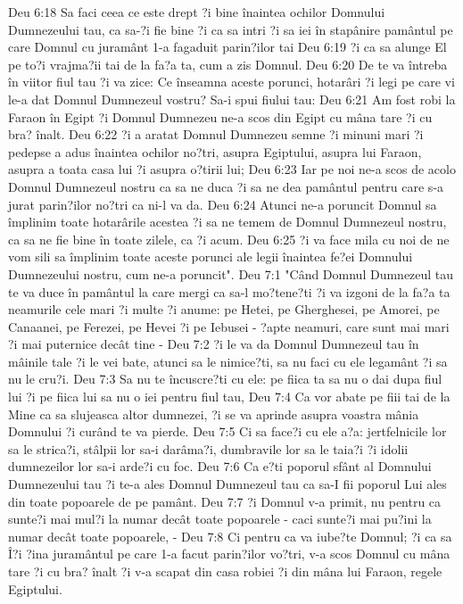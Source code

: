 Deu 6:18  Sa faci ceea ce este drept ?i bine înaintea ochilor Domnului Dumnezeului tau, ca sa-?i fie bine ?i ca sa intri ?i sa iei în stapânire pamântul pe care Domnul cu juramânt 1-a fagaduit parin?ilor tai
Deu 6:19  ?i ca sa alunge El pe to?i vrajma?ii tai de la fa?a ta, cum a zis Domnul.
Deu 6:20  De te va întreba în viitor fiul tau ?i va zice: Ce înseamna aceste porunci, hotarâri ?i legi pe care vi le-a dat Domnul Dumnezeul vostru? Sa-i spui fiului tau:
Deu 6:21  Am fost robi la Faraon în Egipt ?i Domnul Dumnezeu ne-a scos din Egipt cu mâna tare ?i cu bra? înalt.
Deu 6:22  ?i a aratat Domnul Dumnezeu semne ?i minuni mari ?i pedepse a adus înaintea ochilor no?tri, asupra Egiptului, asupra lui Faraon, asupra a toata casa lui ?i asupra o?tirii lui;
Deu 6:23  Iar pe noi ne-a scos de acolo Domnul Dumnezeul nostru ca sa ne duca ?i sa ne dea pamântul pentru care s-a jurat parin?ilor no?tri ca ni-l va da.
Deu 6:24  Atunci ne-a poruncit Domnul sa împlinim toate hotarârile acestea ?i sa ne temem de Domnul Dumnezeul nostru, ca sa ne fie bine în toate zilele, ca ?i acum.
Deu 6:25  ?i va face mila cu noi de ne vom sili sa împlinim toate aceste porunci ale legii înaintea fe?ei Domnului Dumnezeului nostru, cum ne-a poruncit".
Deu 7:1  "Când Domnul Dumnezeul tau te va duce în pamântul la care mergi ca sa-l mo?tene?ti ?i va izgoni de la fa?a ta neamurile cele mari ?i multe ?i anume: pe Hetei, pe Gherghesei, pe Amorei, pe Canaanei, pe Ferezei, pe Hevei ?i pe Iebusei - ?apte neamuri, care sunt mai mari ?i mai puternice decât tine -
Deu 7:2  ?i le va da Domnul Dumnezeul tau în mâinile tale ?i le vei bate, atunci sa le nimice?ti, sa nu faci cu ele legamânt ?i sa nu le cru?i.
Deu 7:3  Sa nu te încuscre?ti cu ele: pe fiica ta sa nu o dai dupa fiul lui ?i pe fiica lui sa nu o iei pentru fiul tau,
Deu 7:4  Ca vor abate pe fiii tai de la Mine ca sa slujeasca altor dumnezei, ?i se va aprinde asupra voastra mânia Domnului ?i curând te va pierde.
Deu 7:5  Ci sa face?i cu ele a?a: jertfelnicile lor sa le strica?i, stâlpii lor sa-i darâma?i, dumbravile lor sa le taia?i ?i idolii dumnezeilor lor sa-i arde?i cu foc.
Deu 7:6  Ca e?ti poporul sfânt al Domnului Dumnezeului tau ?i te-a ales Domnul Dumnezeul tau ca sa-I fii poporul Lui ales din toate popoarele de pe pamânt.
Deu 7:7  ?i Domnul v-a primit, nu pentru ca sunte?i mai mul?i la numar decât toate popoarele - caci sunte?i mai pu?ini la numar decât toate popoarele, -
Deu 7:8  Ci pentru ca va iube?te Domnul; ?i ca sa Î?i ?ina juramântul pe care 1-a facut parin?ilor vo?tri, v-a scos Domnul cu mâna tare ?i cu bra? înalt ?i v-a scapat din casa robiei ?i din mâna lui Faraon, regele Egiptului.
